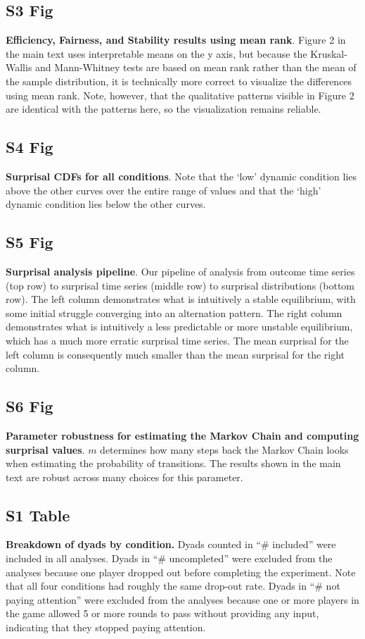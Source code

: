 \documentclass[10pt,letterpaper]{article}
\begin{document}
\subsection*{S3 Fig}
\label{S3_Fig}
{\bf Efficiency, Fairness, and Stability results using mean rank}. Figure 2 in the main text uses interpretable means on the y axis, but because the Kruskal-Wallis and Mann-Whitney tests are based on mean rank rather than the mean of the sample distribution, it is technically more correct to visualize the differences using mean rank. Note, however, that the qualitative patterns visible in Figure 2 are identical with the patterns here, so the visualization remains reliable.

\subsection*{S4 Fig}
\label{S4_Fig}
{\bf Surprisal CDFs for all conditions}. Note that the `low' dynamic condition lies above the other curves over the entire range of values and that the `high' dynamic condition lies below the other curves.

\subsection*{S5 Fig}
\label{S5_Fig}
{\bf Surprisal analysis pipeline}. Our pipeline of analysis from outcome time series (top row) to surprisal time series (middle row) to surprisal distributions (bottom row). The left column demonstrates what is intuitively a stable equilibrium, with some initial struggle converging into an alternation pattern. The right column demonstrates what is intuitively a less predictable or more unstable equilibrium, which has a much more erratic surprisal time series. The mean surprisal for the left column is consequently much smaller than the mean surprisal for the right column.

\subsection*{S6 Fig}
\label{S6_Fig}
{\bf Parameter robustness for estimating the Markov Chain and computing surprisal values}. $m$ determines how many steps back the Markov Chain looks when estimating the probability of transitions. The results shown in the main text are robust across many choices for this parameter.

\subsection*{S1 Table}
\label{S1_Table}
{\bf Breakdown of dyads by condition.} Dyads counted in ``\# included'' were included in all analyses. Dyads in ``\# uncompleted'' were excluded from the analyses because one player dropped out before completing the experiment. Note that all four conditions had roughly the same drop-out rate. Dyads in ``\# not paying attention'' were excluded from the analyses because one or more players in the game allowed 5 or more rounds to pass without providing any input, indicating that they stopped paying attention.
\end{document}
